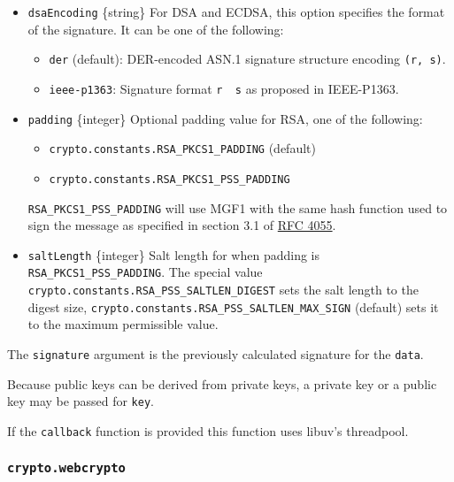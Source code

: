 \begin{itemize}
\item
  \texttt{dsaEncoding} \{string\} For DSA and ECDSA, this option
  specifies the format of the signature. It can be one of the following:

  \begin{itemize}
  \tightlist
  \item
    \texttt{\textquotesingle{}der\textquotesingle{}} (default):
    DER-encoded ASN.1 signature structure encoding \texttt{(r,\ s)}.
  \item
    \texttt{\textquotesingle{}ieee-p1363\textquotesingle{}}: Signature
    format \texttt{r\ \textbar{}\textbar{}\ s} as proposed in
    IEEE-P1363.
  \end{itemize}
\item
  \texttt{padding} \{integer\} Optional padding value for RSA, one of
  the following:

  \begin{itemize}
  \tightlist
  \item
    \texttt{crypto.constants.RSA\_PKCS1\_PADDING} (default)
  \item
    \texttt{crypto.constants.RSA\_PKCS1\_PSS\_PADDING}
  \end{itemize}

  \texttt{RSA\_PKCS1\_PSS\_PADDING} will use MGF1 with the same hash
  function used to sign the message as specified in section 3.1 of
  \href{https://www.rfc-editor.org/rfc/rfc4055.txt}{RFC 4055}.
\item
  \texttt{saltLength} \{integer\} Salt length for when padding is
  \texttt{RSA\_PKCS1\_PSS\_PADDING}. The special value
  \texttt{crypto.constants.RSA\_PSS\_SALTLEN\_DIGEST} sets the salt
  length to the digest size,
  \texttt{crypto.constants.RSA\_PSS\_SALTLEN\_MAX\_SIGN} (default) sets
  it to the maximum permissible value.
\end{itemize}

The \texttt{signature} argument is the previously calculated signature
for the \texttt{data}.

Because public keys can be derived from private keys, a private key or a
public key may be passed for \texttt{key}.

If the \texttt{callback} function is provided this function uses libuv's
threadpool.

\subsubsection{\texorpdfstring{\texttt{crypto.webcrypto}}{crypto.webcrypto}}\label{crypto.webcrypto}

